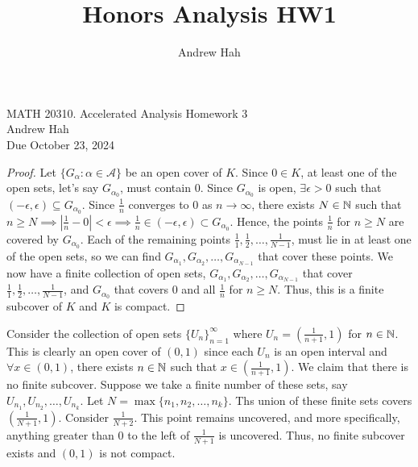 \documentclass[12pt]{article}
\title{Honors Analysis HW1}
\author{Andrew Hah}
\begin{document}
\pagestyle{plain}
\begin{center}
{\Large MATH 20310. Accelerated Analysis Homework 3} \\ 
\vspace{.2in}  
Andrew Hah \\
Due October 23, 2024
\end{center}

\begin{exercise}{12}
    \begin{proof}
        Let $\{ G_\alpha : \alpha \in \mathscr{A} \}$ be an open cover of $K$. Since $0 \in K$, at least one of the open sets, let's say $G_{\alpha_0}$, must contain 0. Since $G_{\alpha_0}$ is open, $\exists \epsilon > 0$ such that $(-\epsilon, \epsilon) \subseteq G_{\alpha_0}$. Since $\frac{1}{n}$ converges to 0 as $n \to \infty$, there exists $N \in \mathbb{N}$ such that $n \ge N \implies |\frac{1}{n} - 0| < \epsilon \implies \frac{1}{n} \in (-\epsilon, \epsilon) \subset G_{\alpha_0}$. Hence, the points $\frac{1}{n}$ for $n \ge N$ are covered by $G_{\alpha_0}$. Each of the remaining points $\frac{1}{1}, \frac{1}{2}, \dots, \frac{1}{N-1}$, must lie in at least one of the open sets, so we can find $G_{\alpha_1}, G_{\alpha_2}, \dots, G_{\alpha_{N-1}}$ that cover these points. We now have a finite collection of open sets, $G_{\alpha_1}, G_{\alpha_2}, \dots, G_{\alpha_{N-1}}$ that cover $\frac{1}{1}, \frac{1}{2}, \dots, \frac{1}{N-1}$, and $G_{\alpha_0}$ that covers 0 and all $\frac{1}{n}$ for $n \ge N$. Thus, this is a finite subcover of $K$ and $K$ is compact. 
    \end{proof}
\end{exercise}

\begin{exercise}{14}
    \begin{solution}Consider the collection of open sets $\{ U_n \}_{n = 1}^\infty$ where $U_n = \left( \frac{1}{n+1}, 1 \right)$ for $n \in \mathbb{N}$. This is clearly an open cover of $(0, 1)$ since each $U_n$ is an open interval and $\forall x \in (0, 1)$, there exists $n \in \mathbb{N}$ such that $x \in \left( \frac{1}{n+1}, 1 \right)$. We claim that there is no finite subcover. Suppose we take a finite number of these sets, say $U_{n_1}, U_{n_2}, \dots, U_{n_k}$. Let $N = \max \{ n_1, n_2, \dots, n_k \}$. Ths union of these finite sets covers $\left( \frac{1}{N + 1}, 1 \right)$. Consider $\frac{1}{N + 2}$. This point remains uncovered, and more specifically, anything greater than 0 to the left of $\frac{1}{N+1}$ is uncovered. Thus, no finite subcover exists and $(0, 1)$ is not compact. 
    \end{solution}
\end{exercise}
\end{document}
